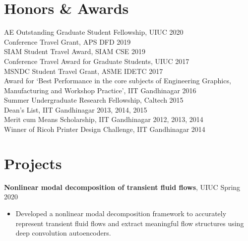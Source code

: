 \documentclass[margin]{res}
\begin{document}
\begin{resume}
\section{\large Honors \& Awards}
AE Outstanding Graduate Student Fellowship, UIUC \hfill 2020\vspace{0.1cm}\\
Conference Travel Grant, APS DFD \hfill 2019\vspace{0.1cm}\\
SIAM Student Travel Award, SIAM CSE \hfill 2019\vspace{0.1cm}\\
Conference Travel Award for Graduate Students, UIUC \hfill 2017\vspace{0.1cm}\\
MSNDC Student Travel Grant, ASME IDETC \hfill 2017\vspace{0.1cm}\\
Award for `Best Performance in the core subjects of Engineering Graphics, Manufacturing and Workshop Practice', IIT Gandhinagar \hfill 2016\vspace{0.1cm}\\
Summer Undergraduate Research Fellowship, Caltech \hfill 2015\vspace{0.1cm}\\
Dean's List, IIT Gandhinagar \hfill 2013, 2014, 2015\vspace{0.1cm}\\
Merit cum Means Scholarship, IIT Gandhinagar \hfill 2012, 2013, 2014\vspace{0.1cm}\\
Winner of Ricoh Printer Design Challenge, IIT Gandhinagar \hfill 2014


\section{\large Projects}

{\bf Nonlinear modal decomposition of transient fluid flows}, UIUC \hfill Spring 2020
\begin{itemize}
\item Developed a nonlinear modal decomposition framework to accurately represent transient fluid flows and extract meaningful flow structures using deep convolution autoencoders.
\end{itemize}


\end{resume}
\end{document}
